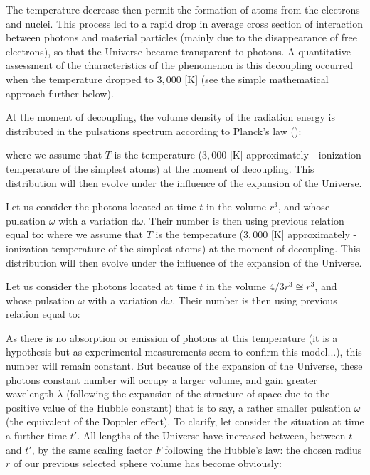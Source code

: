 	The temperature decrease then permit the formation of atoms from the electrons and nuclei. This process led to a rapid drop in average cross section of interaction between photons and material particles (mainly due to the disappearance of free electrons), so that the Universe became transparent to photons. A quantitative assessment of the characteristics of the phenomenon is this decoupling occurred when the temperature dropped to $3,000$ [K] (see the simple mathematical approach further below).

	At the moment of decoupling, the volume density of the radiation energy is distributed in the pulsations spectrum according to Planck's law ():
	
	where we assume that $T$ is the temperature ($3,000$ [K] approximately - ionization temperature of the simplest atoms) at the moment of decoupling. This distribution will then evolve under the influence of the expansion of the Universe.

	Let us consider the photons located at time $t$ in the volume $r^3$, and whose pulsation $\omega$ with a variation $\mathrm{d}\omega$. Their number is then using previous relation equal to:
	where we assume that $T$ is the temperature ($3,000$ [K] approximately - ionization temperature of the simplest atoms) at the moment of decoupling. This distribution will then evolve under the influence of the expansion of the Universe.

	Let us consider the photons located at time $t$ in the volume $4/3r^3\cong r^3$, and whose pulsation $\omega$ with a variation $\mathrm{d}\omega$. Their number is then using previous relation equal to:
	
	As there is no absorption or emission of photons at this temperature (it is a hypothesis but as experimental measurements seem to confirm this model...), this number will remain constant. But because of the expansion of the Universe, these photons constant number will occupy a larger volume, and gain greater wavelength $\lambda$ (following the expansion of the structure of space due to the positive value of the Hubble constant) that is to say, a rather smaller pulsation $\omega$ (the equivalent of the Doppler effect). To clarify, let consider the situation at time a further time $t'$. All lengths of the Universe have increased between, between $t$ and $t'$, by the same scaling factor $F$ following the Hubble's law: the chosen radius $r$ of our previous selected sphere volume has become obviously:
	
